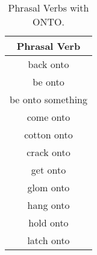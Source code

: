 
\begin{longtable}{c}
\caption{Phrasal Verbs with ONTO.} \label{a:onto} \\
\midrule
\toprule 
\textbf{Phrasal Verb} \\
\midrule
back onto \\
be onto \\
be onto something \\
come onto \\
cotton onto \\
crack onto \\
get onto \\
glom onto \\
hang onto \\
hold onto \\
latch onto \\
\bottomrule
\midrule
\end{longtable}
